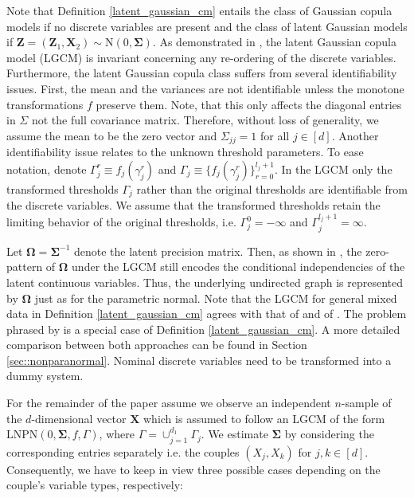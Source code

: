 Note that Definition \ref{latent_gaussian_cm} entails the class of Gaussian copula models if no discrete variables are present and the class of latent Gaussian models if $\mathbf{Z} = (\mathbf{Z}_1, \mathbf{X}_2) \sim \text{N}(0, \mathbf{\Sigma})$. As demonstrated in \cite{Fan17}, the latent Gaussian copula model (LGCM) is invariant concerning any re-ordering of the discrete variables. Furthermore, the latent Gaussian copula class suffers from several identifiability issues. First, the mean and the variances are not identifiable unless the monotone transformations \(f\) preserve them. Note, that this only affects the diagonal entries in \(\Sigma\) not the full covariance matrix. Therefore, without loss of generality, we assume the mean to be the zero vector and \(\Sigma_{jj} = 1\) for all \(j \in [d]\). Another identifiability issue relates to the unknown threshold parameters. To ease notation, denote \(\Gamma_j^r \equiv f_j(\gamma_j^r)\) and \(\Gamma_j \equiv \{f_j(\gamma_j^r)\}_{r=0}^{l_j+1}\). In the LGCM only the transformed thresholds \(\Gamma_j\) rather than the original thresholds are identifiable from the discrete variables. We assume that the transformed thresholds retain the limiting behavior of the original thresholds, i.e. \(\Gamma_{j}^{0} = -\infty\) and \(\Gamma_j^{l_j+1} = \infty\).

Let $\mathbf{\Omega}= \mathbf{\Sigma}^{-1}$ denote the latent precision matrix. Then, as shown in \citet{Liu09}, the zero-pattern of $\mathbf{\Omega}$ under the LGCM still encodes the conditional independencies of the latent continuous variables. Thus, the underlying undirected graph is represented by $\mathbf{\Omega}$ just as for the parametric normal. Note that the LGCM for general mixed data in Definition \ref{latent_gaussian_cm} agrees with that of \citet{Quan18} and of \citet{Feng19}. The problem phrased by \citet{Fan17} is a special case of  Definition \ref{latent_gaussian_cm}. A more detailed comparison between both approaches can be found in Section \ref{sec::nonparanormal}. Nominal discrete variables need to be transformed into a dummy system.

For the remainder of the paper assume we observe an independent $n$-sample of the $d$-dimensional vector $\mathbf{X}$ which is assumed to follow an LGCM of the form \(\text{LNPN}(0, \mathbf{\Sigma}, f, \Gamma)\), where \(\Gamma = \cup_{j=1}^{d_1}\Gamma_j\). We estimate $\mathbf{\Sigma}$ by considering the corresponding entries separately i.e. the couples $(X_j, X_k)$ for \(j,k \in [d]\). Consequently, we have to keep in view three possible cases depending on the couple's variable types, respectively:

